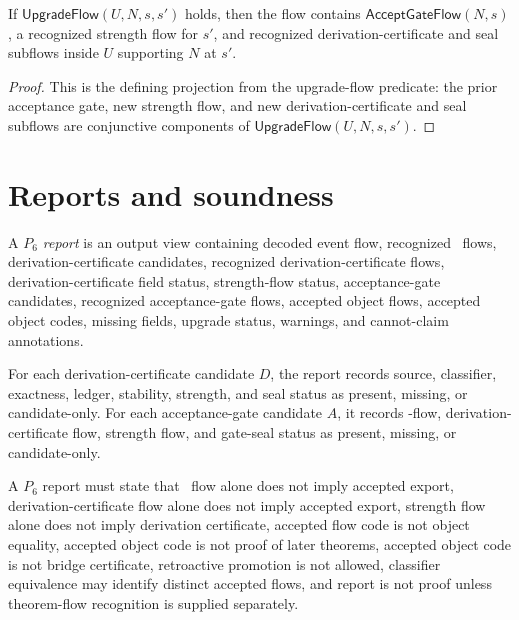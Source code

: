 \begin{theorem}
\label{thm:deriv-accept-upgrade-requires-flow}
If $\mathsf{UpgradeFlow}(U,N,s,s')$ holds, then the flow contains $\mathsf{AcceptGateFlow}(N,s)$, a recognized strength flow for $s'$, and recognized derivation-certificate and seal subflows inside $U$ supporting $N$ at $s'$.
\end{theorem}

\begin{proof}
This is the defining projection from the upgrade-flow predicate: the prior acceptance gate, new strength flow, and new derivation-certificate and seal subflows are conjunctive components of $\mathsf{UpgradeFlow}(U,N,s,s')$.
\end{proof}

\section{Reports and soundness}
\label{sec:deriv-accept-reports-soundness}

\begin{definition}[$P_6$ report]
\label{def:deriv-accept-p6-report}
A \emph{$P_6$ report} is an output view containing decoded event flow, recognized \NameCert\ flows, derivation-certificate candidates, recognized derivation-certificate flows, derivation-certificate field status, strength-flow status, acceptance-gate candidates, recognized acceptance-gate flows, accepted object flows, accepted object codes, missing fields, upgrade status, warnings, and cannot-claim annotations.
\end{definition}

\begin{definition}
\label{def:deriv-accept-field-status}
For each derivation-certificate candidate $D$, the report records source, classifier, exactness, ledger, stability, strength, and seal status as present, missing, or candidate-only. For each acceptance-gate candidate $A$, it records \NameCert-flow, derivation-certificate flow, strength flow, and gate-seal status as present, missing, or candidate-only.
\end{definition}

\begin{definition}
\label{def:deriv-accept-p6-cannot-claims}
A $P_6$ report must state that \NameCert\ flow alone does not imply accepted export, derivation-certificate flow alone does not imply accepted export, strength flow alone does not imply derivation certificate, accepted flow code is not object equality, accepted object code is not proof of later theorems, accepted object code is not bridge certificate, retroactive promotion is not allowed, classifier equivalence may identify distinct accepted flows, and report is not proof unless theorem-flow recognition is supplied separately.
\end{definition}


